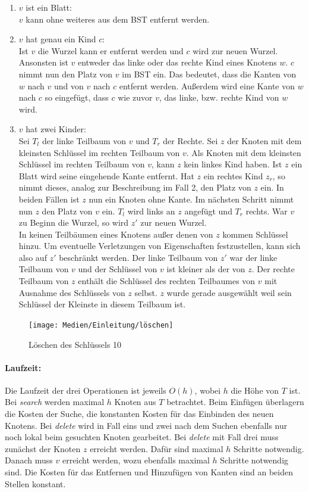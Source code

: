 \documentclass[a4paper,12pt]{article}
\begin{document}
\begin{enumerate}
	\item $v$ ist ein Blatt: \\
	$v$ kann ohne weiteres aus dem BST entfernt werden.
	\item $v$ hat genau ein Kind $c$:\\
	Ist $v$ die Wurzel kann er entfernt werden und $c$ wird zur neuen Wurzel. Ansonsten ist $v$ entweder das linke oder das rechte Kind eines Knotens $w$. $c$ nimmt nun den Platz von $v$ im BST ein. Das bedeutet, dass die Kanten von $w$ nach $v$ und von $v$ nach $c$ entfernt werden. Außerdem wird eine Kante von $w$ nach $c$ so eingefügt, dass $c$ wie zuvor $v$, das linke, bzw. rechte Kind von $w$ wird. 
	\item $v$ hat zwei Kinder:\\
	Sei $T_l$ der linke Teilbaum von $v$ und $T_r$ der Rechte.
	Sei $z$ der Knoten mit dem kleinsten Schlüssel im rechten Teilbaum von $v$. Als Knoten mit dem kleinsten Schlüssel im rechten Teilbaum von $v$, kann $z$ kein linkes Kind haben. Ist $z$ ein Blatt wird seine eingehende Kante entfernt. Hat $z$ ein rechtes Kind $z_r$, so nimmt dieses, analog zur Beschreibung im Fall 2, den Platz von $z$ ein. In beiden Fällen ist $z$ nun ein Knoten ohne Kante. Im nächsten Schritt nimmt nun $z$ den Platz von $v$ ein. $T_l$ wird links an $z$ angefügt und $T_r$ rechts. War $v$ zu Beginn die Wurzel, so wird $z'$ zur neuen Wurzel.\\
	In keinen Teilbäumen eines Knotens außer denen von $z$ kommen Schlüssel hinzu. Um eventuelle Verletzungen von Eigenschaften festzustellen, kann sich also auf $z'$ beschränkt werden. Der linke Teilbaum von $z'$ war der linke Teilbaum von $v$ und der Schlüssel von $v$ ist kleiner als der von $z$. Der rechte Teilbaum von $z$ enthält die Schlüssel des rechten Teilbaumes von $v$ mit Ausnahme des Schlüssels von $z$ selbst. $z$ wurde gerade ausgewählt weil sein Schlüssel der Kleinste in diesem Teilbaum ist. 
	
	
	
	
\end{enumerate} 
\begin{figure}[H]
	\centering
	\texttt{[image: Medien/Einleitung/löschen]}
	\caption{Löschen des Schlüssels 10}
	\label{fig:löschen}
\end{figure}
\paragraph{Laufzeit:}
Die Laufzeit der drei Operationen ist jeweils $\mathit{O(h)}$, wobei $h$ die Höhe von $T$ ist. Bei \textit{search} werden maximal $h$ Knoten aus $T$ betrachtet. Beim Einfügen überlagern die Kosten der Suche, die konstanten Kosten für das Einbinden des neuen Knotens. Bei \textit{delete} wird in Fall eins und zwei nach dem Suchen ebenfalls nur noch lokal beim gesuchten Knoten gearbeitet. Bei \textit{delete} mit Fall drei muss zunächst der Knoten $z$ erreicht werden. Dafür sind maximal $h$ Schritte notwendig. Danach muss $v$ erreicht werden, wozu ebenfalls maximal $h$ Schritte notwendig sind. Die Kosten für das Entfernen und Hinzufügen von Kanten sind an beiden Stellen konstant.  
\end{document}

